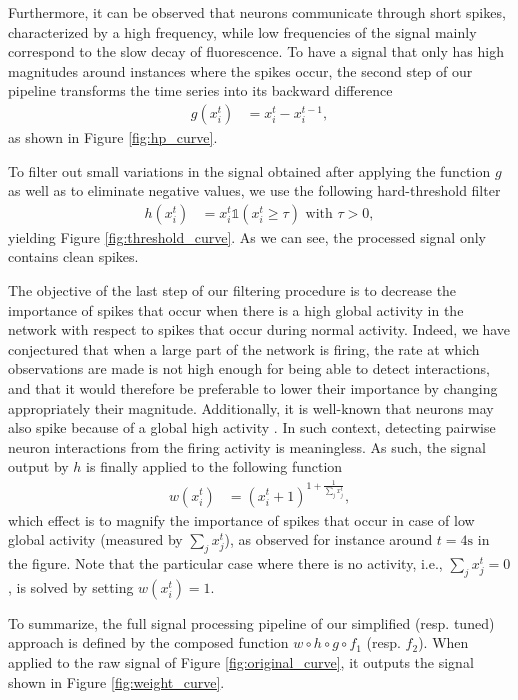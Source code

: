 \documentclass[wcp]{jmlr}
\begin{document}
Furthermore, it can be observed that neurons communicate through short spikes, characterized by a high
frequency, while low frequencies of the signal mainly correspond to the slow
decay of fluorescence. To have a signal that only has high magnitudes around instances where the spikes occur, the second step of our pipeline transforms the time series into its backward
difference
\begin{align}
g(x^{t}_{i}) &= x^{t}_i - x^{t-1}_i \label{eq:high-pass-filter},
\end{align}
as shown in Figure \ref{fig:hp_curve}.

To filter out small variations in the signal obtained after applying the
function $g$ as well as to eliminate negative values, we use the following
hard-threshold filter
\begin{align}
h(x^{t}_i) &= x^{t}_i \mathbb{1}(x^{t}_i \geq \tau) \text{ with } \tau > 0,
\end{align}
yielding Figure \ref{fig:threshold_curve}.
As we can see, the processed signal only contains clean spikes.

The objective of the last step of our filtering procedure is to decrease the
importance of spikes that occur when there is a high global activity in the
network with respect to  spikes that occur during normal activity. Indeed, we
have conjectured that when a large part of the network is firing, the rate at
which observations are made is not high enough for being able to detect
interactions, and that it would therefore be preferable to lower their
importance by changing appropriately their magnitude. Additionally, it is
well-known that neurons may also spike because of a global high activity
\citep{stetter2012model}. In such  context, detecting pairwise neuron
interactions from the firing activity is meaningless. As such,
the signal output by $h$ is finally applied to the following function
\begin{align}
 w(x^{t}_i) &= (x^{t}_i + 1 )^{1 + \frac{1}{\sum_{j} x^{t}_j}}, \label{eq:magnify-filter}
\end{align}
which effect is to magnify the importance of spikes that occur in case of low
global activity (measured by $\sum_{j} x^{t}_j$), as observed for instance
around $t=4\text{s}$ in the figure. Note that the particular case where there
is no activity, i.e., $\sum_{j} x^{t}_j = 0$, is solved by setting $w(x^{t}_i)
= 1$.

To summarize, the full signal processing pipeline of our simplified (resp.
tuned) approach is defined by the composed function $w \circ h \circ g \circ
f_1$ (resp. $f_2$). When applied to the raw signal of Figure
\ref{fig:original_curve}, it outputs the signal shown in Figure
\ref{fig:weight_curve}.
\end{document}
